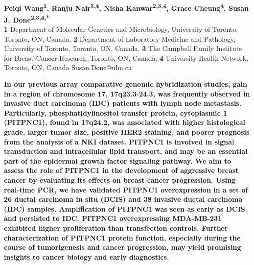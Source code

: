 \documentclass[10pt,letterpaper]{article}
\date{}
\begin{document}
\vspace*{0.35in}

\begin{flushleft}
{\Huge
\textbf{}
}
\newline
\\\textbf{\sffamily
Peiqi Wang\textsuperscript{1},
Ranju Nair\textsuperscript{3,4},
Nisha Kanwar\textsuperscript{2,3,4},
Grace Cheung\textsuperscript{4},
Susan J. Done\textsuperscript{2,3,4,*}
}
\newline
\\\footnotesize{\sffamily
{\bfseries 1} Department of Molecular Genetics and Microbiology, University of Toronto, Toronto, ON, Canada. {\bfseries 2} Department of Laboratory Medicine and Pathology, University of Toronto, Toronto, ON, Canada. {\bfseries 3} The Campbell Family Institute for Breast Cancer Research, Toronto, ON, Canada. {\bfseries 4} University Health Network, Toronto, ON, Canada {\bfseries *} Susan.Done@uhn.ca}
\end{flushleft}


{\bfseries\sffamily
\noindent In our previous array comparative genomic hybridization studies, gain in a region of chromosome 17, 17q23.3-24.3, was frequently observed in invasive duct carcinoma (IDC) patients with lymph node metastasis. Particularly, phosphatidylinositol transfer protein, cytoplasmic 1 (PITPNC1), found in 17q24.2, was associated with higher histological grade, larger tumor size, positive HER2 staining, and poorer prognosis from the analysis of a NKI dataset. PITPNC1 is involved in signal transduction and intracellular lipid transport, and may be an essential part of the epidermal growth factor signaling pathway. We aim to assess the role of PITPNC1 in the development of aggressive breast cancer by evaluating its effects on breast cancer progression. Using real-time PCR, we have validated PITPNC1 overexpression in a set of 26 ductal carcinoma in situ (DCIS) and 38 invasive ductal carcinoma (IDC) samples. Amplification of PITPNC1 was seen as early as DCIS and persisted to IDC. PITPNC1 overexpressing MDA-MB-231 exhibited higher proliferation than transfection controls. Further characterization of PITPNC1 protein function, especially during the course of tumorigenesis and cancer progression, may yield promising insights to cancer biology and early diagnostics.
}
\end{document}

